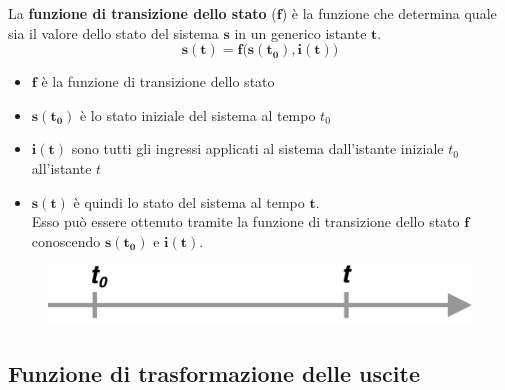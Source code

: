 \begin{frame}
	
	\begin{block}{La \textbf{funzione di transizione dello stato} ($\pmb{f}$)}
		è la funzione che determina quale sia il valore dello stato del sistema $\pmb{s}$ in un generico istante $\pmb{t}$.
		$$\pmb{s(t) = f\Big(s(t_0), i(t)\Big)}$$
		
		\begin{itemize}
			\item $\pmb{f}$ è la funzione di transizione dello stato
			\item $\pmb{s(t_0)}$ è lo stato iniziale del sistema al tempo $t_0$
			\item $\pmb{i(t)}$ sono tutti gli ingressi applicati al sistema dall'istante iniziale $t_0$ all'istante $t$
			\item $\pmb{s(t)}$ è quindi lo stato del sistema al tempo $\pmb{t}$.	\\
			Esso può essere ottenuto tramite la funzione di transizione dello stato $\pmb{f}$ conoscendo $\pmb{s(t_0)}$ e $\pmb{i(t)}$.
		\end{itemize}
		
		\begin{figure}[!htbp]
			\centering
			\includegraphics[width=0.50\linewidth]{images/1_i_sistemi/sistemaF.pdf}
		\end{figure}
	\end{block}
\end{frame}



\subsection[Funzione di trasformazione delle uscite $g$]{Funzione di trasformazione delle uscite}


